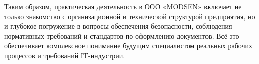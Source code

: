Таким образом, практическая деятельность в ООО «MODSEN» включает не только знакомство с организационной и технической структурой предприятия, но и глубокое погружение в вопросы обеспечения безопасности, соблюдения нормативных требований и стандартов по оформлению документов. Всё это обеспечивает комплексное понимание будущим специалистом реальных рабочих процессов и требований IT-индустрии.

